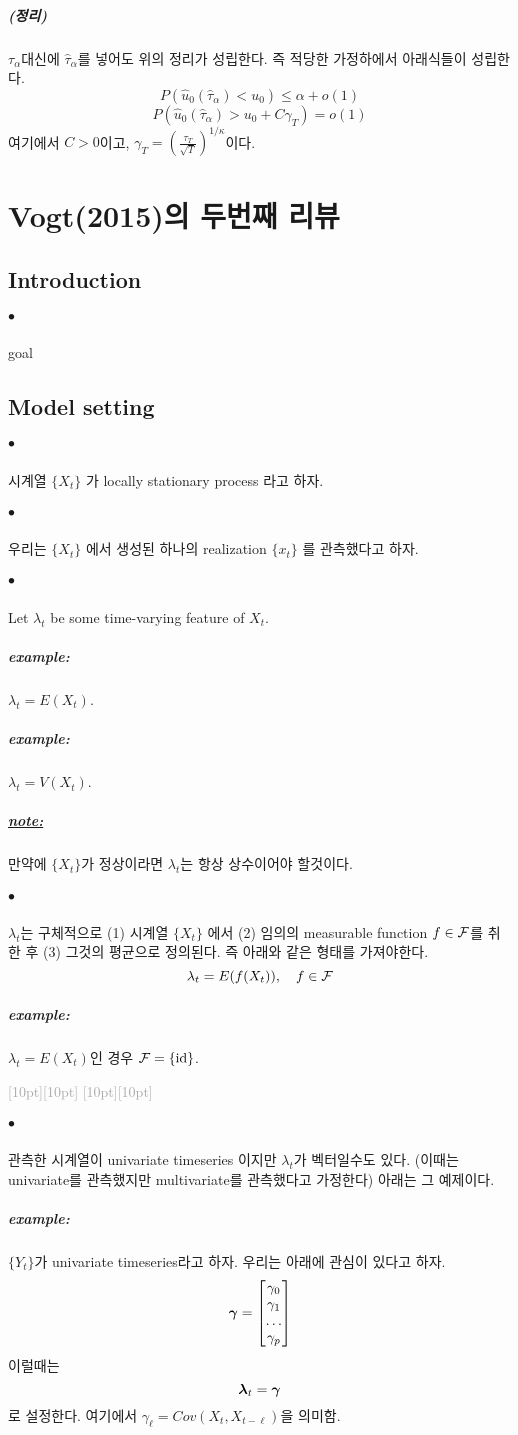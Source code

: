 \documentclass[12pt,oneside,english]{book}
\newcommand{\rdash}{\noindent \textcolor{darkgray}{ \raisebox{-1.9pt}[10pt][10pt]{\leafright} \hrulefill \raisebox{-1.9pt}[10pt][10pt]{\leafright \decofourleft \decothreeleft  \aldineright \decotwo \floweroneleft \decoone}}}
\def\ck{\paragraph{\Large$\bullet$}\Large}
\def\thm{\paragraph{\Large(정리)}\Large}
\def\note{\paragraph{\Large\textit{\underline{note:}}}\Large}
\def\ex{\paragraph{\Large\textit{example:}}\Large}
\newcommand{\bld}[1]{\mbox{\boldmath $#1$}}
\begin{document}
\thm
$\tau_{\alpha}$대신에 $\hat{\tau}_{\alpha}$를 넣어도 위의 정리가 성립한다. 즉 적당한 가정하에서 아래식들이 성립한다.
$$P(\hat{u}_0(\hat{\tau}_{\alpha})<u_0)\leq \alpha +o(1)$$
$$P(\hat{u}_0(\hat{\tau}_{\alpha})>u_0+C\gamma_T)=o(1)$$
여기에서 $C>0$이고, $\gamma_T=\left(\frac{\tau_T}{\sqrt{T}}\right)^{1 / \kappa}$이다. 

\chapter{Vogt(2015)의 두번째 리뷰}
\section{Introduction}
\ck goal
\section{Model setting} 

\ck 시계열 $\{X_t\}$ 가 locally stationary process 라고 하자. 

\ck 우리는 $\{X_t\}$ 에서 생성된 하나의 realization $\{x_t\}$ 를 관측했다고 하자. 

\ck Let $\lambda_t$ be some time-varying feature of $X_t$. 
\ex $\lambda_t=E(X_t)$. 
\ex $\lambda_t=V(X_t)$. 

\note 만약에 $\{X_t\}$가 정상이라면 $\lambda_t$는 항상 상수이어야 할것이다. 

\ck $\lambda_t$는 구체적으로 (1) 시계열 $\{X_t\}$ 에서 (2) 임의의 measurable function $f \in {\cal F}$를 취한 후 (3) 그것의 평균으로 정의된다. 즉 아래와 같은 형태를 가져야한다. 
\[
\lambda_t = E(f(X_t)), \quad f \in {\cal F}
\]

\ex $\lambda_t=E(X_t)$인 경우 ${\cal F}=\{\mbox{id}\}$. 

\rdash 

\ck 관측한 시계열이 univariate timeseries 이지만 $\lambda_t$가 벡터일수도 있다. (이때는 univariate를 관측했지만 multivariate를 관측했다고 가정한다) 아래는 그 예제이다. 

\ex $\{Y_t\}$가 univariate timeseries라고 하자. 우리는 아래에 관심이 있다고 하자. 
\[
\bld{\gamma}=
\begin{bmatrix}
\gamma_0 \\ 
\gamma_1 \\ 
\dots \\
\gamma_p
\end{bmatrix}
\]
이럴때는 
\[
\bld{\lambda}_t=\bld{\gamma}
\]
로 설정한다. 여기에서 $\gamma_{\ell}=Cov(X_t,X_{t-\ell})$을 의미함. 
\end{document}
